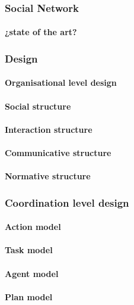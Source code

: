 \documentclass{report}
\begin{document}
			\subsubsection{Social Network}
				\paragraph{¿state of the art?}

			\subsubsection{Design}
				\paragraph{Organisational level design}
				\paragraph{Social structure}
				\paragraph{Interaction structure}
				\paragraph{Communicative structure}
				\paragraph{Normative structure}
				
			\subsubsection{Coordination level design}
				\paragraph{Action model}
				\paragraph{Task model}
				\paragraph{Agent model}
				\paragraph{Plan model}	
\end{document}
